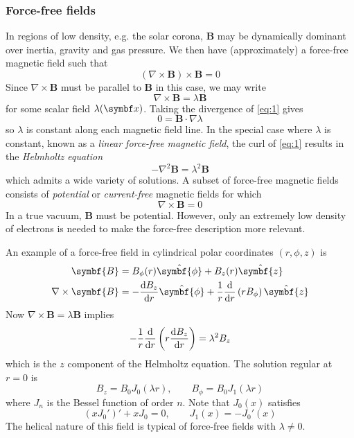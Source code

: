 \documentclass{jknotes}
\newcommand{\B}{\symbf{B}}
\begin{document}
\subsubsection{Force-free fields}
In regions of low density, e.g. the solar corona, $\B$ may be dynamically
dominant over inertia, gravity and gas pressure. We then have (approximately)
a force-free magnetic field such that
\begin{equation}
	(\nabla \times \B) \times \B = 0
\end{equation}
Since $\nabla \times \B$ must be parallel to $\B$ in this case, we may write
\begin{equation}
	\nabla \times \B = \lambda \B
	\label{eq:1}
\end{equation}
for some scalar field $\lambda(\x)$. Taking the divergence of \eqref{eq:1}
gives
\begin{equation}
	0 = \B \cdot \nabla \lambda
\end{equation}
so $\lambda$ is constant along each magnetic field line. In the special case
where $\lambda$ is constant, known as a \emph{linear force-free magnetic
field}, the curl of \eqref{eq:1} results in the \emph{Helmholtz equation}
\begin{equation}
	-\nabla^2 \B = \lambda^2 \B
\end{equation}
which admits a wide variety of solutions. A subset of force-free magnetic
fields consists of \emph{potential} or \emph{current-free} magnetic fields for
which
\begin{equation}
	\nabla \times \B = 0
\end{equation}
In a true vacuum, $\B$ must be potential. However, only an extremely low
density of electrons is needed to make the force-free description more
relevant. 

An example of a force-free field in cylindrical polar coordinates $(r,\phi,z)$
is
\begin{align}
	\B &= B_\phi(r)\hat{\symbf{\phi}} + B_z(r)\hat{\symbf{z}} \\
	\nabla \times \B &= -\frac{\diffd B_z}{\diffd r} \hat{\symbf{\phi}} +
	\frac{1}{r}\frac{\diffd}{\diffd r}\left(rB_\phi\right)\hat{\symbf{z}}
\end{align}
Now $\nabla \times \B = \lambda \B$ implies
\begin{equation}
	-\frac{1}{r}\frac{\diffd}{\diffd r} \left( r \frac{\diffd B_z}{\diffd
	r}\right) = \lambda^2 B_z
\end{equation}
which is the $z$ component of the Helmholtz equation. The solution regular at
$r=0$ is
\begin{equation}
	B_z = B_0 J_0(\lambda r), \hspace{2em} B_\phi = B_0 J_1(\lambda r)
\end{equation}
where $J_n$ is the Bessel function of order $n$. Note that $J_0(x)$ satisfies
\begin{equation}
	(xJ_0')' + xJ_0 = 0, \hspace{2em} J_1(x) = -J_0'(x)
\end{equation}
The helical nature of this field is typical of force-free fields with $\lambda
\ne 0$.
\end{document}
